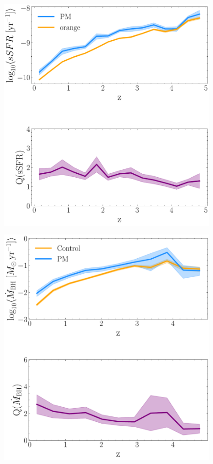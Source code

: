\documentclass[11pt, letterpaper]{article}
\begin{document}
\begin{figure}[htp]
    \centering
    \begin{minipage}{0.45\textwidth}
        \centering
        \includegraphics[width=1\linewidth]{fig/sSFR_z_evolution_merger_vs_control.pdf}
        \label{fig:sSFR_evolution}
    \end{minipage}
    \hspace{0.05\textwidth}  %
    \begin{minipage}{0.45\textwidth}
        \centering
        \includegraphics[width=1\linewidth]{fig/mdot_z_evolution_merger_vs_control.pdf}

\end{minipage}
\end{figure}
\end{document}
